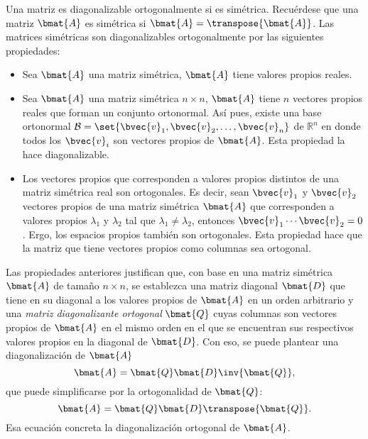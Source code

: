 \documentclass{fmbnotes}
\begin{document}
Una matriz es diagonalizable ortogonalmente si es simétrica. Recuérdese que una matriz \(\bmat{A}\) es simétrica si \(\bmat{A}=\transpose{\bmat{A}}\). Las matrices simétricas son diagonalizables ortogonalmente por las siguientes propiedades:
\begin{itemize}
	\item Sea \(\bmat{A}\) una matriz simétrica, \(\bmat{A}\) tiene valores propios reales.
	\item Sea \(\bmat{A}\) una matriz simétrica \(n\times n\), \(\bmat{A}\) tiene \(n\) vectores propios reales que forman un conjunto ortonormal. Así pues, existe una base ortonormal \(\mathcal{B}=\set{\bvec{v}_1,\bvec{v}_2,\ldots,\bvec{v}_n}\) de \(\mathbb{R}^{n}\) en donde todos los \(\bvec{v}_i\) son vectores propios de \(\bmat{A}\). Esta propiedad la hace diagonalizable.
	\item Los vectores propios que corresponden a valores propios distintos de una matriz simétrica real son ortogonales. Es decir, sean \(\bvec{v}_1\) y \(\bvec{v}_2\) vectores propios de una matriz simétrica \(\bmat{A}\) que corresponden a valores propios \(\lambda_1\) y \(\lambda_2\) tal que \(\lambda_1 \neq\lambda_2\), entonces \(\bvec{v}_1\cdots\bvec{v}_2=0\). Ergo, los espacios propios también son ortogonales. Esta propiedad hace que la matriz que tiene vectores propios como columnas sea ortogonal.	
\end{itemize} 

Las propiedades anteriores justifican que, con base en una matriz simétrica \(\bmat{A}\) de tamaño \(n\times n\), se establezca una matriz diagonal \(\bmat{D}\) que tiene en su diagonal a los valores propios de \(\bmat{A}\) en un orden arbitrario y una \emph{matriz diagonalizante ortogonal} \(\bmat{Q}\) cuyas columnas son vectores propios de \(\bmat{A}\) en el mismo orden en el que se encuentran sus respectivos valores propios en la diagonal de \(\bmat{D}\). Con eso, se puede plantear una diagonalización de \(\bmat{A}\)
\[\bmat{A}=\bmat{Q}\bmat{D}\inv{\bmat{Q}},\]
que puede simplificarse por la ortogonalidad de \(\bmat{Q}\):
\[\bmat{A}=\bmat{Q}\bmat{D}\transpose{\bmat{Q}}.\]
Esa ecuación concreta la diagonalización ortogonal de \(\bmat{A}\).
\end{document}
